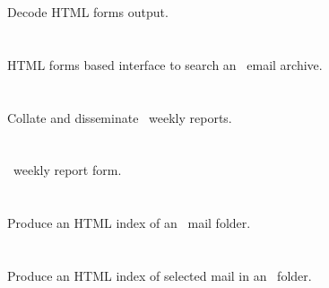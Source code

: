Decode HTML forms output.

 
\newpage
\section{}
\label{pickhtml}
 
HTML forms based interface to search an \aipspp\ email archive.

 
\newpage
\section{}
\label{reap}
 
Collate and disseminate \aipspp\ weekly reports.

 
\newpage
\section{}
\label{report_form}
 
\aipspp\ weekly report form.

 
\newpage
\section{}
\label{scanhtml}
 
Produce an HTML index of an \aipspp\ mail folder.

 
\newpage
\section{}
\label{scanpick}
 
Produce an HTML index of selected mail in an \aipspp\ folder.

